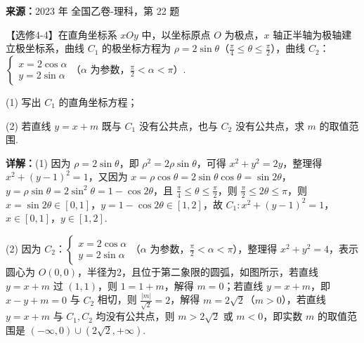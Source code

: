 \begin{question}[points=10]
\textbf{来源：}2023 年 全国乙卷-理科，第 22 题\par
【选修4-4】在直角坐标系 $xOy$ 中，以坐标原点 $O$ 为极点，$x$ 轴正半轴为极轴建立极坐标系，曲线 $C_1$ 的极坐标方程为 $\rho=2\sin\theta$（$\frac{\pi}{4}\le\theta\le\frac{\pi}{2}$），曲线 $C_2$：$\begin{cases} x=2\cos\alpha \\ y=2\sin\alpha \end{cases}$（$\alpha$ 为参数，$\frac{\pi}{2}<\alpha<\pi$）.



(1) 写出 $C_1$ 的直角坐标方程；



(2) 若直线 $y=x+m$ 既与 $C_1$ 没有公共点，也与 $C_2$ 没有公共点，求 $m$ 的取值范围.
\begin{solution}

\textbf{详解：}(1) 因为 $\rho=2\sin\theta$，即 $\rho^2=2\rho\sin\theta$，可得 $x^2+y^2=2y$，整理得 $x^2+(y-1)^2=1$，又因为 $x=\rho\cos\theta=2\sin\theta\cos\theta=\sin2\theta$，$y=\rho\sin\theta=2\sin^2\theta=1-\cos2\theta$，且 $\frac{\pi}{4}\le\theta\le\frac{\pi}{2}$，则 $\frac{\pi}{2}\le2\theta\le\pi$，则 $x=\sin2\theta\in[0,1]$，$y=1-\cos2\theta\in[1,2]$，故 $C_1: x^2+(y-1)^2=1$，$x\in[0,1]$，$y\in[1,2]$.

(2) 因为 $C_2$：$\begin{cases} x=2\cos\alpha \\ y=2\sin\alpha \end{cases}$（$\alpha$ 为参数，$\frac{\pi}{2}<\alpha<\pi$），整理得 $x^2+y^2=4$，表示圆心为 $O(0,0)$，半径为2，且位于第二象限的圆弧，如图所示，若直线 $y=x+m$ 过 $(1,1)$，则 $1=1+m$，解得 $m=0$；若直线 $y=x+m$，即 $x-y+m=0$ 与 $C_2$ 相切，则 $\frac{|m|}{\sqrt{2}}=2$，解得 $m=2\sqrt{2}$（$m>0$），若直线 $y=x+m$ 与 $C_1,C_2$ 均没有公共点，则 $m>2\sqrt{2}$ 或 $m<0$，即实数 $m$ 的取值范围是 $(-\infty,0)\cup(2\sqrt{2},+\infty)$.
\end{solution}
\end{question}

